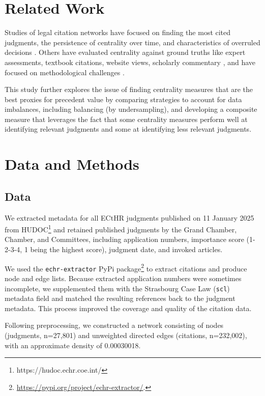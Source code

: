 \documentclass[sigconf]{acmart}
\begin{document}
\section{Related Work}

Studies of legal citation networks have focused on finding the most cited judgments, the persistence of centrality over time, and characteristics of overruled decisions \cite{neale2013, whalen2014, vankuppevelt2017}. Others have evaluated centrality against ground truths like expert assessments, textbook citations, website views, scholarly commentary \cite{FOWLER200816, Derlen_etal_2014, neale2013, agnoloni2015, vanopijnen2014, vankuppevelt2020, Dijck23}, and have focused on methodological challenges \cite{vankuppevelt2020}.

This study further explores the issue of finding centrality measures that are the best proxies for precedent value by comparing strategies to account for data imbalances, including balancing (by undersampling), and developing a composite measure that leverages the fact that some centrality measures perform well at identifying relevant judgments and some at identifying less relevant judgments.


\section{Data and Methods}

\subsection{Data}

We extracted metadata for all ECtHR judgments published on 11 January 2025 from HUDOC\footnote{https://hudoc.echr.coe.int/} and retained published judgments by the Grand Chamber, Chamber, and Committees, including application numbers, importance score (1-2-3-4, 1 being the highest score), judgment date, and invoked articles.

We used the \texttt{echr-extractor} PyPi package\footnote{\url{https://pypi.org/project/echr-extractor/}.} to extract citations and produce node and edge lists. Because extracted application numbers were sometimes incomplete, we supplemented them with the Strasbourg Case Law (\texttt{scl}) metadata field and matched the resulting references back to the judgment metadata. This process improved the coverage and quality of the citation data.

Following preprocessing, we constructed a network consisting of nodes (judgments, n=27,801) and unweighted directed edges (citations, n=232,002), with an approximate density of 0.00030018.
\end{document}
